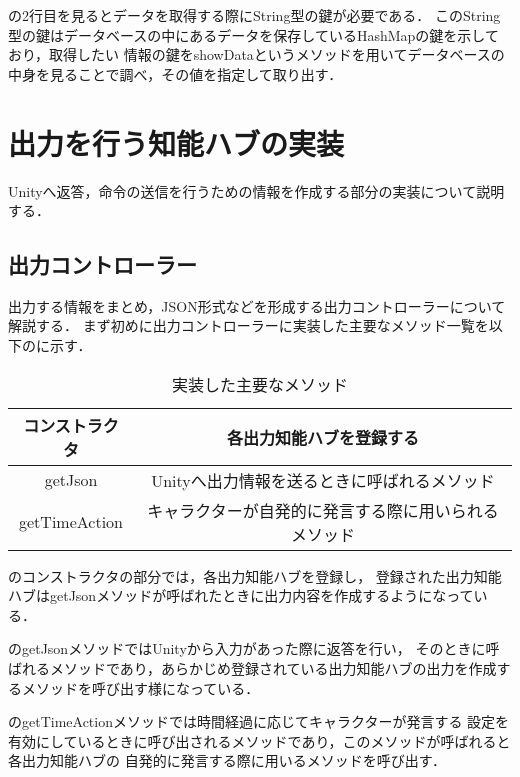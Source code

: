 
の2行目を見るとデータを取得する際にString型の鍵が必要である．
このString型の鍵はデータベースの中にあるデータを保存しているHashMapの鍵を示しており，取得したい
情報の鍵をshowDataというメソッドを用いてデータベースの中身を見ることで調べ，その値を指定して取り出す．


\section{出力を行う知能ハブの実装}
Unityへ返答，命令の送信を行うための情報を作成する部分の実装について説明する．

\subsection{出力コントローラー}
出力する情報をまとめ，JSON形式などを形成する出力コントローラーについて解説する．
まず初めに出力コントローラーに実装した主要なメソッド一覧を以下のに示す．

\begin{table}[tbh]
	\caption{実装した主要なメソッド} \label{tab:OutputController}
	\begin{center}
		\begin{tabular}[htb]{c|c}
		\hline
		コンストラクタ & 各出力知能ハブを登録する \\
		\hline
		getJson & Unityへ出力情報を送るときに呼ばれるメソッド \\
		\hline
		getTimeAction & キャラクターが自発的に発言する際に用いられるメソッド \\
		\hline
		\end{tabular}
	\end{center}
\end{table}

のコンストラクタの部分では，各出力知能ハブを登録し，
登録された出力知能ハブはgetJsonメソッドが呼ばれたときに出力内容を作成するようになっている．

のgetJsonメソッドではUnityから入力があった際に返答を行い，
そのときに呼ばれるメソッドであり，あらかじめ登録されている出力知能ハブの出力を作成するメソッドを呼び出す様になっている．

のgetTimeActionメソッドでは時間経過に応じてキャラクターが発言する
設定を有効にしているときに呼び出されるメソッドであり，このメソッドが呼ばれると各出力知能ハブの
自発的に発言する際に用いるメソッドを呼び出す．


